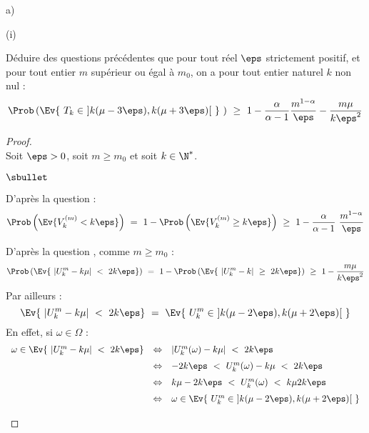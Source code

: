 \documentclass[11pt]{article}%
\begin{document}
\begin{liste}{a)}
\begin{nonoliste}{(i)}


  \item Déduire des questions précédentes que pour tout réel $\eps$
    strictement positif, et pour tout entier $m$ supérieur ou égal à
    $m_{0}$, on a pour tout entier naturel $k$ non nul :
    \[
    \Prob\left(\Ev{\ T_{k} \in \ ]k(\mu - 3 \eps), k(\mu + 3 \eps)[ \
      } \ \right) \ \geq \ 1 - \dfrac{\alpha}{\alpha-1}
    \dfrac{m^{1-\alpha}}{\eps} - \dfrac{m \mu}{k \eps^{2}}
    \]

    \begin{proof}~\\%
      Soit $\eps > 0$, soit $m \geq m_0$ et soit $k \in \N^*$.
      \begin{noliste}{$\sbullet$}
      \item D'après la question  :
        \[
        \Prob\left(\Ev{ V_{k}^{(m)} < k \eps}\right) \ = \ 1 -
        \Prob\left(\Ev{ V_{k}^{(m)} \geq k \eps } \right) \ \geq \ 1 -
        \dfrac{\alpha}{\alpha-1} \ \dfrac{m^{1-\alpha}}{\eps}
        \]

      \item D'après la question , comme $m \geq m_0$ :
        \[
        \Prob\left(\Ev{ \ |U_{k}^{m} - k \mu| \ < \ 2 k \eps} \right)
        \ = \ 1 - \Prob\left(\Ev{ \ |U_{k}^{m} - k| \ \geq \ 2 k \eps}
        \right) \ \geq \ 1 - \dfrac{m \mu}{k \eps^2}
        \]
        Par ailleurs : 
        \[
        \Ev{ \ |U_{k}^{m} - k \mu| \ < \ 2 k \eps} \ = \ \Ev{ \
          U_{k}^{m} \in \ ]k (\mu-2\eps), k (\mu+2\eps)[ \ }
        \]
        En effet, si $\omega \in \Omega$ :
        \[
        \begin{array}{rcl}
          \omega \in \Ev{ \ |U_{k}^{m} - k \mu| \ < \ 2 k \eps} &
          \Leftrightarrow & |U_{k}^{m}(\omega) - k \mu| \ < \ 2 k \eps
          \\[.2cm]
          & \Leftrightarrow & -2 k \eps \ < \ U_{k}^{m}(\omega) - k
          \mu \ < \ 2 k \eps 
          \\[.2cm]
          & \Leftrightarrow & k \mu - 2 k \eps \ < \ U_{k}^{m}(\omega)
          \ < \ k \mu 2 k \eps  
          \\[.2cm]
          & \Leftrightarrow & \omega \in \Ev{ \ U_{k}^{m} \in \ ]k
            (\mu-2\eps), k (\mu+2\eps)[ \ } 
        \end{array}
        \]


\end{noliste}
\end{proof}
\end{nonoliste}
\end{liste}
\end{document}
